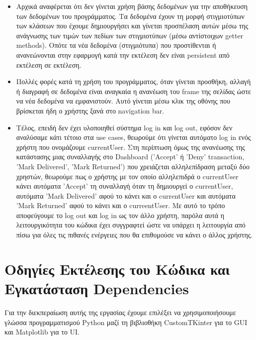 \documentclass[12pt,a4paper]{article}
\begin{document}
\begin{itemize}
    \item Αρχικά αναφέρεται ότι δεν γίνεται χρήση βάσης δεδομένων για την αποθήκευση των δεδομένων του προγράμματος. Τα δεδομένα έχουν τη μορφή στιγμιοτύπων των κλάσεων που έχουμε δημιουργήσει και γίνεται προσπέλαση αυτών μέσω της ανάγνωσης των τιμών των πεδίων των στιγμιοτύπων (μέσω αντίστοιχων getter methods). Οπότε τα νέα δεδομένα (στιγμιότυπα) που προστίθενται ή ανανεώνονται στην εφαρμογή κατά την εκτέλεση δεν είναι persistent από εκτέλεση σε εκτέλεση.
    \item Πολλές φορές κατά τη χρήση του προγράμματος, όταν γίνεται προσθήκη, αλλαγή ή διαγραφή σε δεδομένα είναι αναγκαία η ανανέωση του frame της σελίδας ώστε να νέα δεδομένα να εμφανιστούν. Αυτό γίνεται μέσω κλικ της οθόνης που βρίσκεται ήδη ο χρήστης ξανά στο navigation bar.
    \item Τέλος, επειδή δεν έχει υλοποιηθεί σύστημα log in και log out, εφόσον δεν αναλύσαμε κάτι τέτοιο στα use cases, θεωρούμε ότι γίνεται αυτόματο log in ενός χρήστη που ονομάζουμε currentUser. Στη περίπτωση όμως της ανανέωσης της κατάστασης μιας συναλλαγής στο Dashboard ('Accept' ή 'Deny' transaction, 'Mark Delivered', 'Mark Returned') που χρειάζεται αλληλεπίδραση μεταξύ δύο χρηστών, θεωρούμε πως ο χρήστης με τον οποίο αλληλεπιδρά ο currentUser κάνει αυτόματα 'Accept' τη συναλλαγή όταν τη δημιουργεί ο currentUser, αυτόματα 'Mark Delivered' αφού το κάνει και ο currentUser και αυτόματα 'Mark Returned' αφού το κάνει και ο curreentUser. Με αυτό το τρόπο αποφεύγουμε το log out και log in ως τον άλλο χρήστη, παρόλα αυτά η λειτουργικότητα του κώδικα έχει συγγραφτεί ώστε να υπάρχει η λειτουργία από πίσω για όλες τις πιθανές ενέργειες που θα επιθυμούσε να κάνει ο άλλος χρήστης.
\end{itemize}

\section{Οδηγίες Εκτέλεσης του Κώδικα και Εγκατάσταση Dependencies}
Για την διεκπεραίωση αυτής της εργασίας έχουμε επιλέξει να χρησιμοποιήσουμε γλώσσα προγραμματισμού Python μαζί τη βιβλιοθήκη CustomTKinter για το GUI και Matplotlib για το UI.
\end{document}
